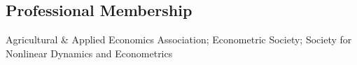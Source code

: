 \documentclass[10pt]{article}
\begin{document}
	\subsection*{Professional Membership}
	Agricultural \& Applied Economics Association; 
		Econometric Society;
	Society for Nonlinear Dynamics and Econometrics
	
	
\end{document}
